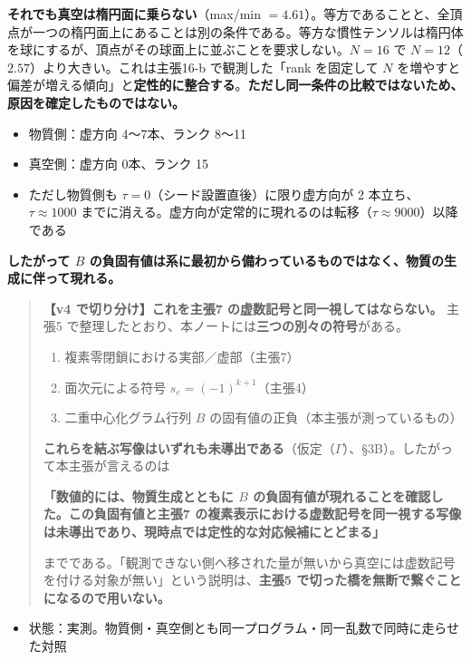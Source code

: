 \documentclass[
  10pt,
]{ltjsarticle}
\providecommand{\tightlist}{%
  \setlength{\itemsep}{0pt}\setlength{\parskip}{0pt}}
\begin{document}
\textbf{それでも真空は楕円面に乗らない}（max/min
\(= 4.61\)）。等方であることと、全頂点が一つの楕円面上にあることは別の条件である。等方な慣性テンソルは楕円体を球にするが、頂点がその球面上に並ぶことを要求しない。\(N=16\)
で \(N=12\)（\(2.57\)）より大きい。これは主張16-b で観測した「rank
を固定して \(N\)
を増やすと偏差が増える傾向」と\textbf{定性的に整合する}。\textbf{ただし同一条件の比較ではないため、原因を確定したものではない。}

\begin{itemize}
\tightlist
\item
  物質側：虚方向 4〜7本、ランク 8〜11
\item
  真空側：虚方向 0本、ランク 15
\item
  ただし物質側も \(\tau = 0\)（シード設置直後）に限り虚方向が 2
  本立ち、\(\tau \approx 1000\)
  までに消える。虚方向が定常的に現れるのは転移（\(\tau \approx 9000\)）以降である
\end{itemize}

\textbf{したがって \(B\)
の負固有値は系に最初から備わっているものではなく、物質の生成に伴って現れる。}

\begin{quote}
\textbf{【v4 で切り分け】これを主張7 の虚数記号と同一視してはならない。}
主張5 で整理したとおり、本ノートには\textbf{三つの別々の符号}がある。

\begin{enumerate}
\def\labelenumi{\arabic{enumi}.}
\tightlist
\item
  複素零閉鎖における実部／虚部（主張7）
\item
  面次元による符号 \(s_e = (-1)^{k+1}\)（主張4）
\item
  二重中心化グラム行列 \(B\) の固有値の正負（本主張が測っているもの）
\end{enumerate}

\textbf{これらを結ぶ写像はいずれも未導出である}（仮定（\(\Gamma\)）、§3B）。したがって本主張が言えるのは

\textbf{「数値的には、物質生成とともに \(B\)
の負固有値が現れることを確認した。この負固有値と主張7
の複素表示における虚数記号を同一視する写像は未導出であり、現時点では定性的な対応候補にとどまる」}

までである。「観測できない側へ移された量が無いから真空には虚数記号を付ける対象が無い」という説明は、\textbf{主張5
で切った橋を無断で繋ぐことになるので用いない。}
\end{quote}

\begin{itemize}
\tightlist
\item
  状態：実測。物質側・真空側とも同一プログラム・同一乱数で同時に走らせた対照
\end{itemize}
\end{document}
